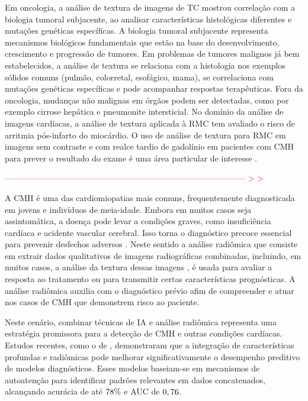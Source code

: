 Em oncologia, a análise de textura de imagens de \gls{TC} mostrou correlação com a biologia tumoral subjacente, ao analisar características histológicas diferentes e mutações genéticas específicas. A biologia tumoral subjacente representa mecanismos biológicos fundamentais que estão na base do desenvolvimento, crescimento e progressão de tumores. Em problemas de tumores malignos já bem estabelecidos, a análise de textura se relaciona com a histologia nos exemplos sólidos comuns (pulmão, colorretal, esofágico, mama), se correlaciona com mutações genéticas específicas e pode acompanhar respostas terapêuticas. Fora da oncologia, mudanças não malignas em órgãos podem ser detectadas, como por exemplo cirrose hepática e pneumonite intersticial. No domínio da análise de imagens cardíacas, a análise de textura aplicada à \gls{RMC} tem avaliado o risco de arritmia pós-infarto do miocárdio. O uso de análise de textura para \gls{RMC} em imagens sem contraste e com realce tardio de gadolínio em pacientes com \gls{CMH} para prever o resultado do exame é uma área particular de interesse \cite{schofieldTextureAnalysisCardiovascular2019a}.

\textcolor{red}{--------------------------------------------------------------------------------------- > >}


A \gls{CMH} é uma das cardiomiopatias mais comuns, frequentemente diagnosticada em jovens e indivíduos de meia-idade. Embora em muitos casos seja assintomática, a doença pode levar a condições graves, como insuficiência cardíaca e acidente vascular cerebral. Isso torna o diagnóstico precoce essencial para prevenir desfechos adversos \cite{kwonComparisonMortalityCause2022}. Neste sentido a análise radiômica que consiste em extrair dados qualitativos de imagens radiográficas combinadas, incluindo, em muitos casos, a análise da textura dessas imagens \cite{lambinRadiomicsExtractingMore2012}, é usada para avaliar a resposta ao tratamento ou para transmitir certas características prognósticas. A análise radiômica auxilia com o diagnóstico prévio afim de compreender e atuar nos casos de \gls{CMH} que demonstrem risco ao paciente.


Neste cenário, combinar técnicas de \gls{IA} e análise radiômica representa uma estratégia promissora para a detecção de CMH e outras condições cardíacas. Estudos recentes, como o de , demonstraram que a integração de características profundas e radiômicas pode melhorar significativamente o desempenho preditivo de modelos diagnósticos. Esses modelos baseiam-se em mecanismos de autoatenção para identificar padrões relevantes em dados concatenados, alcançando acurácia de até $78\%$ e AUC de $0,76$.



